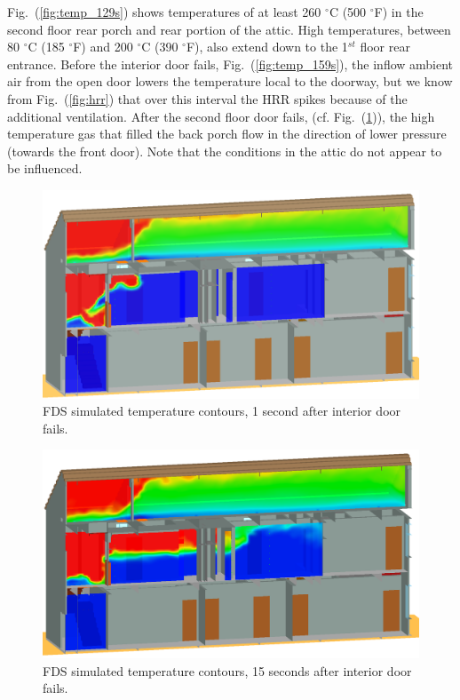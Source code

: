 \documentclass[11pt,oneside]{book}
\begin{document}
Fig.~(\ref{fig:temp_129s}) shows temperatures of at least 260 $^{\circ}$C (500 $^{\circ}$F) in the second floor rear porch and rear portion of the attic. High temperatures, between 80 $^{\circ}$C (185 $^{\circ}$F) and 200 $^{\circ}$C (390 $^{\circ}$F), also extend down to the 1$^{st}$ floor rear entrance. Before the interior door fails, Fig.~(\ref{fig:temp_159s}), the inflow ambient air from the open door lowers the temperature local to the doorway, but we know from Fig.~(\ref{fig:hrr}) that over this interval the HRR spikes because of the additional ventilation. After the second floor door fails, (cf. Fig.~(\ref{fig:temp_161s})), the high temperature gas that filled the back porch flow in the direction of lower pressure (towards the front door). Note that the conditions in the attic do not appear to be influenced.
\begin{figure}[!ht]
\includegraphics[width=.675\textwidth]{../Figures/west_50th_baseline_161}
 

\caption{FDS simulated temperature contours, 1 second after interior door fails.}
\label{fig:temp_161s}
\end{figure}

\begin{figure}[!ht]
\includegraphics[width=.675\textwidth]{../Figures/west_50th_baseline_175}
 

\caption{FDS simulated temperature contours, 15 seconds after interior door fails.}
\label{fig:temp_175s}
\end{figure}
\end{document}
